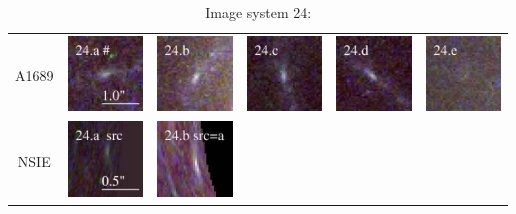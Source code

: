 \documentclass[useAMS,usenatbib]{mn2e}
\begin{document}
\begin{table}
  \caption{Image system 24:}\vspace{0mm}
  \begin{tabular}{cccccc}
    \multicolumn{1}{m{1cm}}{{\Large A1689}}
    & \multicolumn{1}{m{1.7cm}}{\includegraphics[height=2.00cm,clip]{figs/nsie_img/rgb.img_24_a.ps}}
    & \multicolumn{1}{m{1.7cm}}{\includegraphics[height=2.00cm,clip]{figs/nsie_img/rgb.img_24_b.ps}}
    & \multicolumn{1}{m{1.7cm}}{\includegraphics[height=2.00cm,clip]{figs/nsie_img/rgb.img_24_c.ps}}
    & \multicolumn{1}{m{1.7cm}}{\includegraphics[height=2.00cm,clip]{figs/nsie_img/rgb.img_24_d.ps}}
    & \multicolumn{1}{m{1.7cm}}{\includegraphics[height=2.00cm,clip]{figs/nsie_img/rgb.img_24_e.ps}} \\
    \multicolumn{1}{m{1cm}}{{\Large NSIE}}
    & \multicolumn{1}{m{1.7cm}}{\includegraphics[height=2.00cm,clip]{figs/nsie_img/rgb.src_24_a.ps}}
    & \multicolumn{1}{m{1.7cm}}{\includegraphics[height=2.00cm,clip]{figs/nsie_img/rgb.pre_24_b_a_tri.ps}}

\end{tabular}
\end{table}
\end{document}
